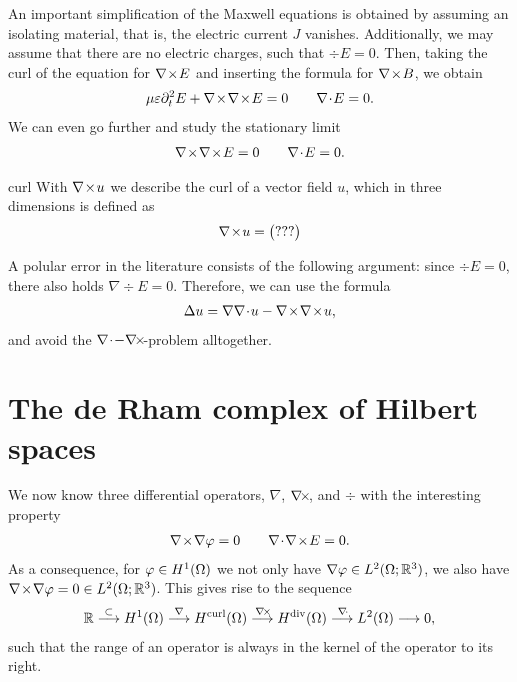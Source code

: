 \begin{intro}
  An important simplification of the Maxwell equations is obtained by
  assuming an isolating material, that is, the electric current $J$
  vanishes. Additionally, we may assume that there are no electric
  charges, such that $\div E=0$. Then, taking the curl of the equation
  for $\nabla\!\times\! E$ and inserting the formula for $\nabla\!\times\! B$, we obtain
  \begin{gather}
    \mu\varepsilon \partial_t^2 E + \nabla\!\times\!\nabla\!\times\! E = 0
    \qquad \nabla\!\cdot\! E=0.
  \end{gather}
  We can even go further and study the stationary limit
  \begin{gather}
    \nabla\!\times\!\nabla\!\times\! E=0 \qquad \nabla\!\cdot\! E=0.
  \end{gather}
\end{intro}

\begin{Notation}{curl}
  With $\nabla\!\times\! u$ we describe the curl of a vector field $u$, which in
  three dimensions is defined as
  \begin{gather}
    \nabla\!\times\! u =
    \begin{pmatrix}
      ???
    \end{pmatrix}
  \end{gather}
\end{Notation}

\begin{remark}
  A polular error in the literature consists of the following
  argument: since $\div E = 0$, there also holds $\nabla \div E =
  0$. Therefore, we can use the formula
  \begin{gather*}
    \Delta u = \nabla\nabla\!\cdot\! u - \nabla\!\times\!\nabla\!\times\! u,
  \end{gather*}
  and avoid the $\nabla\!\cdot\!-\nabla\!\times\!$-problem alltogether.
\end{remark}

\section{The de Rham complex of Hilbert spaces}

\begin{intro}
  We now know three differential operators, $\nabla$, $\nabla\!\times\!$, and
  $\div$ with the interesting property
  \begin{gather}
    \nabla\!\times\!\nabla \varphi = 0
    \qquad \nabla\!\cdot\!\nabla\!\times\! E=0.
  \end{gather}
  As a consequence, for $\varphi\in H^1(\Omega)$ we not only have
  $\nabla \varphi\in L^2(\Omega;\mathbb R^3)$, we also have
  $\nabla\!\times\!\nabla\varphi=0\in L^2(\Omega;\mathbb R^3)$. This gives rise to the sequence
  \begin{gather}
    \mathbb R
    \overset{\subset}{\longrightarrow} H^1(\Omega)
    \overset{\nabla}{\longrightarrow} H^{\text{curl}}(\Omega)
    \overset{\nabla\!\times\!}{\longrightarrow} H^{\text{div}}(\Omega)
    \overset{\nabla\!\cdot\!}{\longrightarrow} L^2(\Omega)
    \longrightarrow 0,
  \end{gather}
  such that the range of an operator is always in the kernel of the
  operator to its right.
\end{intro}

